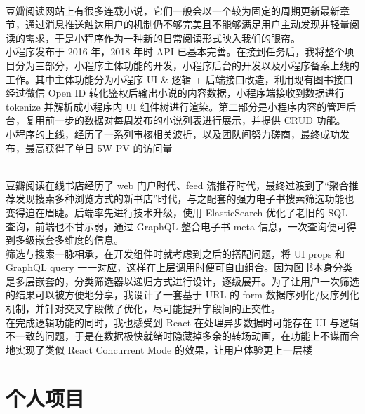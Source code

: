 \documentclass[11pt,a4paper,roman]{moderncv}   %
\begin{document}
{\\豆瓣阅读网站上有很多连载小说，它们一般会以一个较为固定的周期更新最新章节，通过消息推送触达用户的机制仍不够完美且不能够满足用户主动发现并轻量阅读的需求，于是小程序作为一种新的日常阅读形式映入我们的眼帘。\\
小程序发布于 2016 年，2018 年时 API 已基本完善。在接到任务后，我将整个项目分为三部分，小程序主体功能的开发，小程序后台的开发以及小程序备案上线的工作。其中主体功能分为小程序 UI \& 逻辑 + 后端接口改造，利用现有图书接口经过微信 Open ID 转化鉴权后输出小说的内容数据，小程序端接收到数据进行 tokenize 并解析成小程序内 UI 组件树进行渲染。第二部分是小程序内容的管理后台，复用前一步的数据对每周发布的小说列表进行展示，并提供 CRUD 功能。\\
小程序的上线，经历了一系列审核相关波折，以及团队间努力磋商，最终成功发布，最高获得了单日 5W PV 的访问量}
{}{}

{\\豆瓣阅读在线书店经历了 web 门户时代、feed 流推荐时代，最终过渡到了“聚合推荐发现搜索多种浏览方式的新书店”时代，与之配套的强力电子书搜索筛选功能也变得迫在眉睫。后端率先进行技术升级，使用 ElasticSearch 优化了老旧的 SQL 查询，前端也不甘示弱，通过 GraphQL 整合电子书 meta 信息，一次查询便可得到多级嵌套多维度的信息。\\
筛选与搜索一脉相承，在开发组件时就考虑到之后的搭配问题，将 UI props 和 GraphQL query 一一对应，这样在上层调用时便可自由组合。因为图书本身分类是多层嵌套的，分类筛选器以递归方式进行设计，逐级展开。为了让用户一次筛选的结果可以被方便地分享，我设计了一套基于 URL 的 form 数据序列化/反序列化机制，并针对交叉字段做了优化，尽可能提升字段间的正交性。\\
在完成逻辑功能的同时，我也感受到 React 在处理异步数据时可能存在 UI 与逻辑不一致的问题，于是在数据极快就绪时隐藏掉多余的转场动画，在功能上不谋而合地实现了类似 React Concurrent Mode 的效果，让用户体验更上一层楼
}
{}{}

\section{个人项目}
\end{document}
